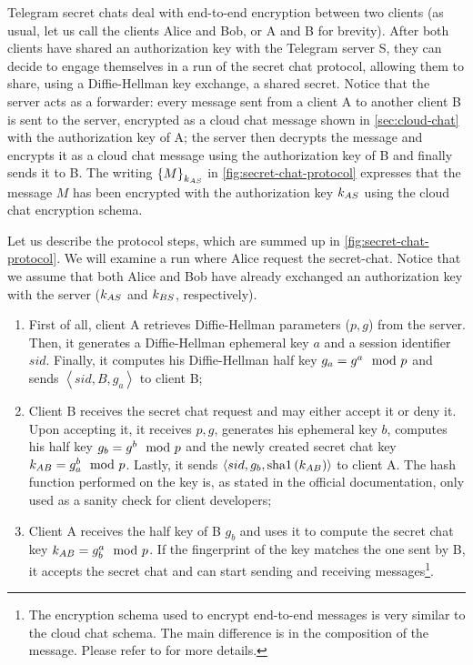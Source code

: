 Telegram secret chats deal with end-to-end encryption between two clients (as usual, let us call the clients Alice and Bob, or A and B for brevity). After both clients have shared an authorization key with the Telegram server S, they can decide to engage themselves in a run of the secret chat protocol, allowing them to share, using a Diffie-Hellman key exchange, a shared secret. Notice that the server acts as a forwarder: every message sent from a client A to another client B is sent to the server, encrypted as a cloud chat message shown in \cref{sec:cloud-chat} with the authorization key of A; the server then decrypts the message and encrypts it as a cloud chat message using the authorization key of B and finally sends it to B. The writing $\left\{M\right\}_{k_{AS}}$ in \cref{fig:secret-chat-protocol} expresses that the message $M$ has been encrypted with the authorization key $k_{AS}$ using the cloud chat encryption schema.

Let us describe the protocol steps, which are summed up in \cref{fig:secret-chat-protocol}. We will examine a run where Alice request the secret-chat. Notice that we assume that both Alice and Bob have already exchanged an authorization key with the server ($k_{AS}$ and $k_{BS}$, respectively).

\begin{enumerate}
    \item{First of all, client A retrieves Diffie-Hellman parameters ($p, g$) from the server. Then, it generates a Diffie-Hellman ephemeral key $a$ and a session identifier $sid$. Finally, it computes his Diffie-Hellman half key $g_a = g^a \mod{p}$ and sends $\left<sid, B, g_a\right>$ to client B;}
    \item{Client B receives the secret chat request and may either accept it or deny it. Upon accepting it, it receives $p, g$, generates his ephemeral key $b$, computes his half key $g_b = g^b \mod{p}$ and the newly created secret chat key $k_{AB} = g_a^b \mod{p}$. Lastly, it sends $\left<sid, g_b, \mbox{sha1}\left(k_{AB}\right)\right>$ to client A. The hash function performed on the key is, as stated in the official documentation, only used as a sanity check for client developers;}
    \item{Client A receives the half key of B $g_b$ and uses it to compute the secret chat key $k_{AB} = g_b^a \mod{p}$. If the fingerprint of the key matches the one sent by B, it accepts the secret chat and can start sending and receiving messages\footnote{The encryption schema used to encrypt end-to-end messages is very similar to the cloud chat schema. The main difference is in the composition of the message. Please refer to \cite{Telegram-EndToEnd} for more details.}.}
\end{enumerate}

